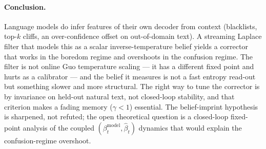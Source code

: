 \documentclass[11pt]{article}
\begin{document}
\paragraph{Conclusion.} Language models do infer features of their own
decoder from context (blacklists, top-$k$ cliffs, an over-confidence offset on
out-of-domain text). A streaming Laplace filter that models this as a scalar
inverse-temperature belief yields a corrector that works in the boredom regime
and overshoots in the confusion regime. The filter is not online Guo
temperature scaling --- it has a different fixed point and hurts as a calibrator
--- and the belief it measures is not a fast entropy read-out but something
slower and more structural. The right way to tune the corrector is by invariance
on held-out natural text, not closed-loop stability, and that criterion makes a
fading memory ($\gamma<1$) essential. The belief-imprint hypothesis is
sharpened, not refuted; the open theoretical question is a closed-loop
fixed-point analysis of the coupled $(\beta^{\mathrm{model}}_t,\hat\beta_t)$
dynamics that would explain the confusion-regime overshoot.



\end{document}
